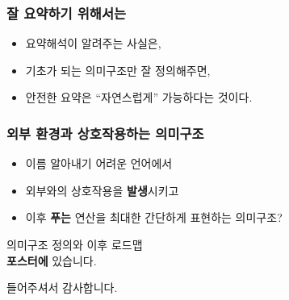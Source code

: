 \documentclass{beamer}
\theoremstyle{definition}
\begin{document}
\begin{frame}[c,fragile]
  \frametitle{잘 요약하기 위해서는}
  \begin{itemize}
    \item 요약해석이 알려주는 사실은,
    \item 기초가 되는 의미구조만 잘 정의해주면,
    \item 안전한 요약은 ``자연스럽게'' 가능하다는 것이다.
  \end{itemize}
\end{frame}
\begin{frame}[c,fragile]
  \frametitle{외부 환경과 상호작용하는 의미구조}
  \begin{itemize}
    \item 이름 알아내기 어려운 언어에서
    \item 외부와의 상호작용을 \textbf{발생}시키고
    \item 이후 \textbf{푸는} 연산을 최대한 간단하게 표현하는 의미구조?
  \end{itemize}

  \begin{center}
  \end{center}
\end{frame}
\begin{frame}
  \begin{center}\LARGE
    의미구조 정의와 이후 로드맵\\
    \textbf{포스터에} 있습니다.

    \large
    들어주셔서 감사합니다.
  \end{center}
\end{frame}
\end{document}
